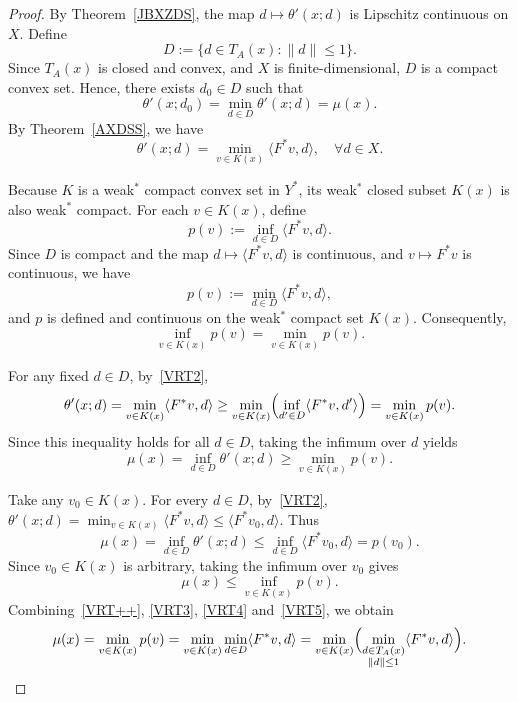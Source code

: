\documentclass[11pt]{article}
\begin{document}
\begin{proof}
	By Theorem~\ref{JBXZDS}, the map $d\mapsto\theta'(x;d)$ is Lipschitz continuous on $X$.
		Define
	\[
	D:=\{d\in T_A(x):\|d\|\le 1\}.
	\]
	Since $T_A(x)$ is closed and convex, and $X$ is finite-dimensional, $D$ is a compact convex set. Hence, there exists $d_0\in D$ such that
	\begin{equation}\label{VRT1}
		\theta'(x;d_0)=\min_{d\in D} \theta'(x;d)=\mu(x).
	\end{equation}
		By Theorem~\ref{AXDSS}, we have
	\begin{equation}\label{VRT2}
		\theta'(x;d)=\min_{v\in K(x)}\langle F^*v,d\rangle , \quad \forall d\in X.  
	\end{equation}
	
	Because $K$ is a weak$^*$ compact convex set in $Y^*$, its weak$^*$ closed subset $K(x)$ is also weak$^*$ compact.
	For each $v\in K(x)$, define
	\[
	p(v) := \inf_{d\in D} \langle F^*v, d\rangle .
	\]
	Since $D$ is compact and the map $d\mapsto \langle F^*v, d\rangle$ is continuous, and $v\mapsto F^*v$ is continuous, we have
	\begin{equation}\label{VRT++}
		p(v) := \min_{d\in D} \langle F^*v, d\rangle ,
	\end{equation}
	and $p$ is defined and continuous on the weak$^*$ compact set $K(x)$. Consequently,
	\begin{equation}\label{VRT3}
		\inf_{v\in K(x)} p(v) = \min_{v\in K(x)} p(v).
	\end{equation}
	
	For any fixed $d\in D$, by~\eqref{VRT2},
	\[
	\theta'(x;d) = \min_{v\in K(x)} \langle F^*v, d\rangle \ge \min_{v\in K(x)} \Bigl( \inf_{d'\in D} \langle F^*v, d'\rangle \Bigr) = \min_{v\in K(x)} p(v).
	\]
	Since this inequality holds for all $d\in D$, taking the infimum over $d$ yields
	\begin{equation}\label{VRT4}
		\mu(x) = \inf_{d\in D} \theta'(x;d) \ge \min_{v\in K(x)} p(v).  
	\end{equation}
	
	Take any $v_0 \in K(x)$. For every $d\in D$, by~\eqref{VRT2}, $\theta'(x;d) = \min_{v\in K(x)} \langle F^*v, d\rangle \le \langle F^*v_0, d\rangle$. Thus
	\[
	\mu(x) = \inf_{d\in D} \theta'(x;d) \le \inf_{d\in D} \langle F^*v_0, d\rangle = p(v_0).
	\]
	Since $v_0\in K(x)$ is arbitrary, taking the infimum over $v_0$ gives
	\begin{equation}\label{VRT5}
		\mu(x) \le \inf_{v\in K(x)} p(v).  
	\end{equation}
	Combining~\eqref{VRT++}, \eqref{VRT3}, \eqref{VRT4} and~\eqref{VRT5}, we obtain
	\begin{equation}\label{VRT6}
		\mu(x) = \min_{v\in K(x)} p(v) = \min_{v\in K(x)} \min_{d\in D} \langle F^*v, d\rangle =\min_{v\in K(x)}\Bigl(\min_{\substack{d\in T_A(x)\\\|d\|\le 1}}\langle F^*v,d\rangle\Bigr).
	\end{equation}
	

\end{proof}
\end{document}
